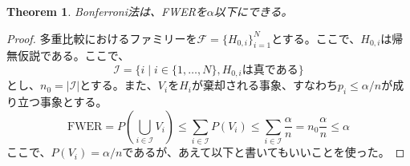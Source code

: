 \documentclass[12pt]{jarticle}
\numberwithin{equation}{section}    %
\numberwithin{figure}{section}      %
\numberwithin{table}{section}      %
\newtheorem{theorem}{Theorem}
\begin{document}
\begin{theorem}
    Bonferroni法は、FWERを$\alpha$以下にできる。
\end{theorem}
\begin{proof}
    多重比較におけるファミリーを$\mathcal{F} = \{H_{0, i}\}_{i = 1}^{N}$とする。ここで、$H_{0, i}$は帰無仮説である。ここで、
    \begin{equation}
        \mathcal{I} = \{i \mid i \in \{1, \ldots, N\}, H_{0, i}は真である\}
    \end{equation}
    とし、$n_{0} = |\mathcal{I}|$とする。また、$V_{i}$を$H_{i}$が棄却される事象、すなわち$p_{i} \le \alpha / n$が成り立つ事象とする。
    \begin{equation}
        \text{FWER} = P\left(\bigcup_{i \in \mathcal{I}} V_{i}\right) \le \sum_{i \in \mathcal{I}} P(V_{i}) \le \sum_{i \in \mathcal{I}} \frac{\alpha}{n} = n_{0} \frac{\alpha}{n} \le \alpha
    \end{equation}
    ここで、$P(V_{i}) = \alpha / n$であるが、あえて以下と書いてもいいことを使った。
\end{proof}
\end{document}
